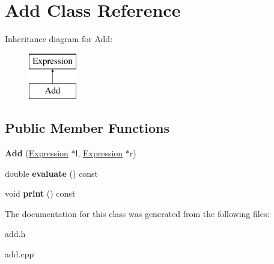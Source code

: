 \hypertarget{class_add}{}\section{Add Class Reference}
\label{class_add}
Inheritance diagram for Add\+:\begin{figure}[H]
\begin{center}
\leavevmode
\includegraphics[height=2.000000cm]{class_add}
\end{center}
\end{figure}
\subsection*{Public Member Functions}
\begin{DoxyCompactItemize}
\item 
\mbox{\label{class_add_a2e122c2aa72180550626ecded3f26644}} 
{\bfseries Add} (\hyperlink{class_expression}{Expression} $\ast$l, \hyperlink{class_expression}{Expression} $\ast$r)
\item 
\mbox{\label{class_add_ac5b3425e7ac47b9f9a83e2f6da0d81ca}} 
double {\bfseries evaluate} () const
\item 
\mbox{\label{class_add_ad5af4ca57a44efab928c58ef39b00df1}} 
void {\bfseries print} () const
\end{DoxyCompactItemize}


The documentation for this class was generated from the following files\+:\begin{DoxyCompactItemize}
\item 
add.\+h\item 
add.\+cpp\end{DoxyCompactItemize}
